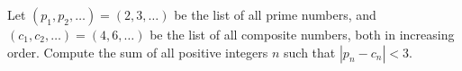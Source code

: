 Let $(p_1, p_2, \dots) = (2, 3, \dots)$ be the list of all prime numbers, and $(c_1, c_2, \dots) = (4, 6, \dots)$ be the list of all composite numbers, both in increasing order. Compute the sum of all positive integers $n$ such that $|p_n - c_n| < 3$.
